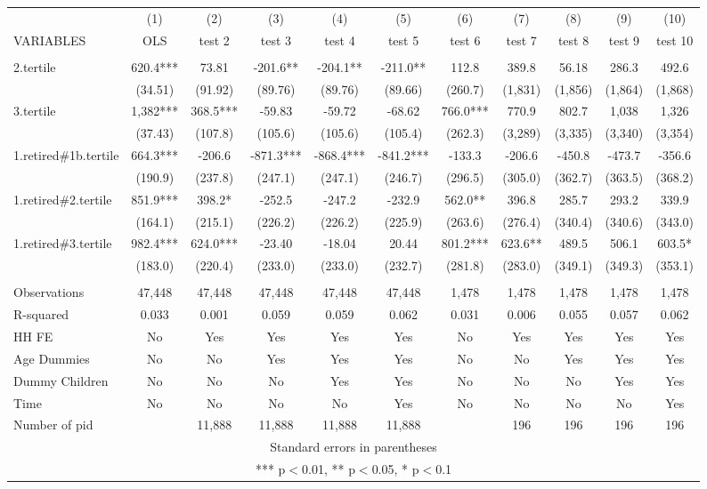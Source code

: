 \begin{tabular}{lcccccccccc} \hline
 & (1) & (2) & (3) & (4) & (5) & (6) & (7) & (8) & (9) & (10) \\
VARIABLES & OLS & test 2 & test 3 & test 4 & test 5 & test 6 & test 7 & test 8 & test 9 & test 10 \\ \hline
 &  &  &  &  &  &  &  &  &  &  \\
2.tertile & 620.4*** & 73.81 & -201.6** & -204.1** & -211.0** & 112.8 & 389.8 & 56.18 & 286.3 & 492.6 \\
 & (34.51) & (91.92) & (89.76) & (89.76) & (89.66) & (260.7) & (1,831) & (1,856) & (1,864) & (1,868) \\
3.tertile & 1,382*** & 368.5*** & -59.83 & -59.72 & -68.62 & 766.0*** & 770.9 & 802.7 & 1,038 & 1,326 \\
 & (37.43) & (107.8) & (105.6) & (105.6) & (105.4) & (262.3) & (3,289) & (3,335) & (3,340) & (3,354) \\
1.retired\#1b.tertile & 664.3*** & -206.6 & -871.3*** & -868.4*** & -841.2*** & -133.3 & -206.6 & -450.8 & -473.7 & -356.6 \\
 & (190.9) & (237.8) & (247.1) & (247.1) & (246.7) & (296.5) & (305.0) & (362.7) & (363.5) & (368.2) \\
1.retired\#2.tertile & 851.9*** & 398.2* & -252.5 & -247.2 & -232.9 & 562.0** & 396.8 & 285.7 & 293.2 & 339.9 \\
 & (164.1) & (215.1) & (226.2) & (226.2) & (225.9) & (263.6) & (276.4) & (340.4) & (340.6) & (343.0) \\
1.retired\#3.tertile & 982.4*** & 624.0*** & -23.40 & -18.04 & 20.44 & 801.2*** & 623.6** & 489.5 & 506.1 & 603.5* \\
 & (183.0) & (220.4) & (233.0) & (233.0) & (232.7) & (281.8) & (283.0) & (349.1) & (349.3) & (353.1) \\
 &  &  &  &  &  &  &  &  &  &  \\
Observations & 47,448 & 47,448 & 47,448 & 47,448 & 47,448 & 1,478 & 1,478 & 1,478 & 1,478 & 1,478 \\
R-squared & 0.033 & 0.001 & 0.059 & 0.059 & 0.062 & 0.031 & 0.006 & 0.055 & 0.057 & 0.062 \\
HH FE & No & Yes & Yes & Yes & Yes & No & Yes & Yes & Yes & Yes \\
Age Dummies & No & No & Yes & Yes & Yes & No & No & Yes & Yes & Yes \\
Dummy Children & No & No & No & Yes & Yes & No & No & No & Yes & Yes \\
Time & No & No & No & No & Yes & No & No & No & No & Yes \\
 Number of pid &  & 11,888 & 11,888 & 11,888 & 11,888 &  & 196 & 196 & 196 & 196 \\ \hline
\multicolumn{11}{c}{ Standard errors in parentheses} \\
\multicolumn{11}{c}{ *** p$<$0.01, ** p$<$0.05, * p$<$0.1} \\
\end{tabular}
